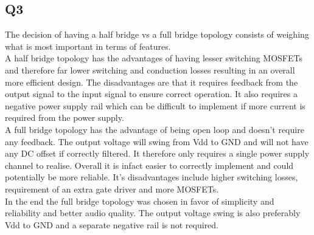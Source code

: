 \documentclass[]{article}
\begin{document}
\begin{multicols}{2}
	\section{Q3}
	The decision of having a half bridge vs a full bridge topology consists of weighing what is most important in terms of features.\\
	A half bridge topology has the advantages of having lesser switching MOSFETs and therefore far lower switching and conduction losses resulting in an overall more efficient design. The disadvantages are that it requires feedback from the output signal to the input signal to ensure correct operation. It also requires a negative power supply rail which can be difficult to implement if more current is required from the power supply.\\
	A full bridge topology has the advantage of being open loop and doesn't require any feedback. The output voltage will swing from Vdd to GND and will not have any DC offset if correctly filtered.
	It therefore only requires a single power supply channel to realise. Overall it is infact easier to correctly implement and could potentially be more reliable.
	It's disadvantages include higher switching losses, requirement of an extra gate driver and more MOSFETs.\\
	In the end the full bridge topology was chosen in favor of simplicity and reliability and better audio quality. The output voltage swing is also preferably Vdd to GND and a separate negative rail is not required.
\end{multicols}

	
\end{document}
